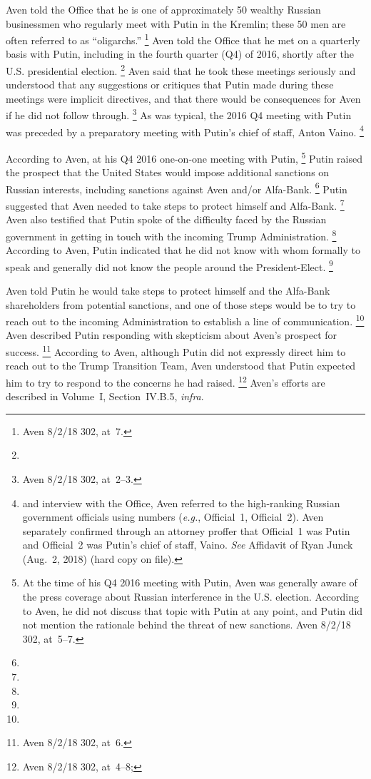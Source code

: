 Aven told the Office that he is one of approximately 50 wealthy Russian businessmen who regularly meet with Putin in the Kremlin; these 50 men are often referred to as ``oligarchs.''%
\footnote{Aven 8/2/18 302, at~7.}
Aven told the Office that he met on a quarterly basis with Putin, including in the fourth quarter (Q4) of 2016, shortly after the U.S. presidential election.%
\footnote{}
Aven said that he took these meetings seriously and understood that any suggestions or critiques that Putin made during these meetings were implicit directives, and that there would be consequences for Aven if he did not follow through.%
\footnote{Aven 8/2/18 302, at~2--3.}
As was typical, the 2016 Q4 meeting with Putin was preceded by a preparatory meeting with Putin's chief of staff, Anton Vaino.%
\footnote{ and interview with the Office, Aven referred to the high-ranking Russian government officials using numbers (\textit{e.g.}, Official~1, Official~2).
Aven separately confirmed through an attorney proffer that Official~1 was Putin and Official~2 was Putin's chief of staff, Vaino.
\textit{See} Affidavit of Ryan Junck (Aug.~2, 2018) (hard copy on file).}

According to Aven, at his Q4 2016 one-on-one meeting with Putin,%
\footnote{At the time of his Q4 2016 meeting with Putin, Aven was generally aware of the press coverage about Russian interference in the U.S. election.
According to Aven, he did not discuss that topic with Putin at any point, and Putin did not mention the rationale behind the threat of new sanctions.
Aven 8/2/18 302, at~5--7.}
Putin raised the prospect that the United States would impose additional sanctions on Russian interests, including sanctions against Aven and/or Alfa-Bank.%
\footnote{}
Putin suggested that Aven needed to take steps to protect himself and Alfa-Bank.%
\footnote{}
Aven also testified that Putin spoke of the difficulty faced by the Russian government in getting in touch with the incoming Trump Administration.%
\footnote{}
According to Aven, Putin indicated that he did not know with whom formally to speak and generally did not know the people around the President-Elect.%
\footnote{}

Aven
told Putin he would take steps to protect himself and the Alfa-Bank shareholders from potential sanctions, and one of those steps would be to try to reach out to the incoming Administration to establish a line of communication.%
\footnote{}
Aven described Putin responding with skepticism about Aven's prospect for success.%
\footnote{ Aven 8/2/18 302, at~6.}
According to Aven, although Putin did not expressly direct him to reach out to the Trump Transition Team, Aven understood that Putin expected him to try to respond to the concerns he had raised.%
\footnote{Aven 8/2/18 302, at~4--8; }
Aven's efforts are described in Volume~I, Section~IV.B.5, \textit{infra}.

